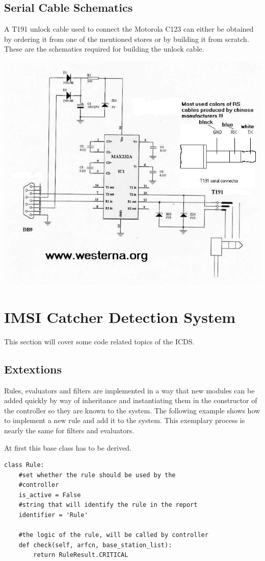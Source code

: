 \section{Serial Cable Schematics}
\label{sec:osmo_serial_schematics}
A T191 unlock cable used to connect the Motorola C123 can either be obtained by ordering it from one of the mentioned stores or by building it from scratch.
These are the schematics required for building the unlock cable.
\vfill
\begin{center}
\includegraphics[width=.9\textwidth]{../Images/t191cable}
\end{center}
\vfill
\chapter{IMSI Catcher Detection System}
This section will cover some code related topics of the ICDS.
\section{Extextions}
\label{sec:extensions}
Rules, evaluators and filters are implemented in a way that new modules can be added quickly by way of inheritance and instantiating them in the constructor of the controller so they are known to the system.
The following example shows how to implement a new rule and add it to the system.
This exemplary process is nearly the same for filters and evaluators.

At first this base class has to be derived.
\begin{lstlisting}
class Rule:
    #set whether the rule should be used by the 
    #controller
    is_active = False
    #string that will identify the rule in the report
    identifier = 'Rule'

    #the logic of the rule, will be called by controller
    def check(self, arfcn, base_station_list):
        return RuleResult.CRITICAL
\end{lstlisting}

